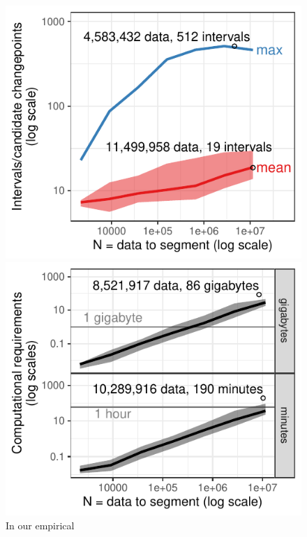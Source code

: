 \documentclass[article]{jss}
\begin{document}
\begin{figure}[t!]
\centering
\begin{minipage}{3in}
  \includegraphics{jss-figure-target-intervals-models}
\end{minipage} 
\begin{minipage}{3in}
  \includegraphics{jss-figure-target-intervals-models-computation}
\end{minipage}
\caption{\label{fig:target-intervals-models-all} In our empirical
}
\end{figure}
\end{document}
